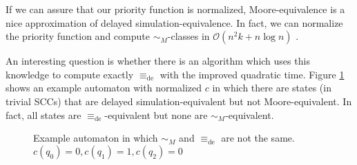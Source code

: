 If we can assure that our priority function is normalized, Moore-equivalence is a nice approximation of delayed simulation-equivalence. In fact, we can normalize the priority function and compute $\sim_M$-classes in $\mathcal{O}(n^2 k + n \log n)$ \cite{}.

An interesting question is whether there is an algorithm which uses this knowledge to compute exactly $\equiv_\text{de}$ with the improved quadratic time. Figure \ref{fig:fwe:deM_diff} shows an example automaton with normalized $c$ in which there are states (in trivial SCCs) that are delayed simulation-equivalent but not Moore-equivalent. In fact, all states are $\equiv_\text{de}$-equivalent but none are $\sim_M$-equivalent.


\begin{figure}
\centering
{}
\caption{Example automaton in which $\sim_M$ and $\equiv_\text{de}$ are not the same. $c(q_0) = 0, c(q_1) = 1, c(q_2) = 0$}
\label{fig:fwe:deM_diff}
\end{figure}

















